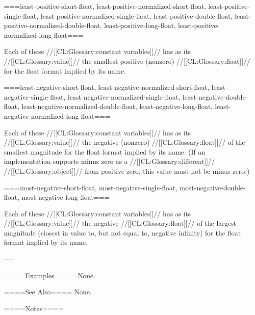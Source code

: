 ===least-positive-short-float, least-positive-normalized-short-float, least-positive-single-float, least-positive-normalized-single-float, least-positive-double-float, least-positive-normalized-double-float, least-positive-long-float, least-positive-normalized-long-float===

Each of these //[[CL:Glossary:constant variables]]// has as its //[[CL:Glossary:value]]// the smallest positive (nonzero) //[[CL:Glossary:float]]// for the float format implied by its name.

===least-negative-short-float, least-negative-normalized-short-float, least-negative-single-float, least-negative-normalized-single-float, least-negative-double-float, least-negative-normalized-double-float, least-negative-long-float, least-negative-normalized-long-float===

Each of these //[[CL:Glossary:constant variables]]// has as its //[[CL:Glossary:value]]// the negative (nonzero) //[[CL:Glossary:float]]// of the smallest magnitude for the float format implied by its name. (If an implementation supports minus zero as a //[[CL:Glossary:different]]// //[[CL:Glossary:object]]// from positive zero, this value must not be minus zero.)

===most-negative-short-float, most-negative-single-float, most-negative-double-float, most-negative-long-float===

Each of these //[[CL:Glossary:constant variables]]// has as its //[[CL:Glossary:value]]// the negative //[[CL:Glossary:float]]// of the largest magnitude (closest in value to, but not equal to, negative infinity) for the float format implied by its name.

-----

====Examples====
None.

====See Also====
None.

====Notes====

